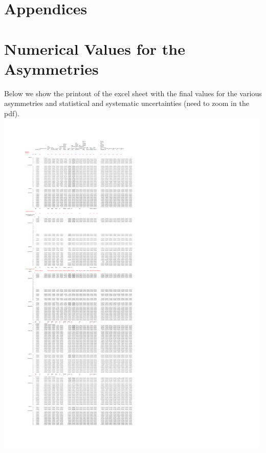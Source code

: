 \documentclass[english,notitlepage,12pt,a4paper]{article}
\begin{document}
\newpage
\tableofcontents

\newpage
  \listoffigures
     \listoftables
     
\newpage















\appendix
\label{sec:appendix}
\section*{Appendices}
\renewcommand{\thesubsection}{\Alph{subsection}}



\section{Numerical Values for the Asymmetries}
Below we show the printout of the excel sheet with the final values for the various asymmetries and statistical and systematic uncertainties (need to zoom in the pdf).
\includegraphics[width=0.99\textwidth]{FinalResult_2017_BugfixedJuly3_2017_Relabelled2_Page.pdf}




%



%


\end{document}
